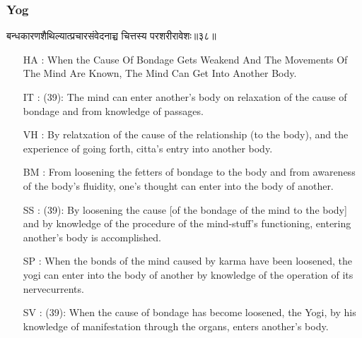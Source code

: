 \begin{frame}[fragile]\frametitle{Yog}
\begin{sanskrit}
बन्धकारणशैथिल्यात्प्रचारसंवेदनाच्च चित्तस्य परशरीरावेशः॥३८॥
\end{sanskrit}
	\begin{itemize}
	\item [HA]: When the Cause Of Bondage Gets Weakend And The Movements Of The Mind Are Known, The Mind Can Get Into Another Body.
	\item [IT]: (39): The mind can enter another’s body on relaxation of the cause of bondage and from knowledge of passages.
	\item [VH]: By relatxation of the cause of the relationship (to the body), and the experience of going forth, citta’s entry into another body.
	\item [BM]: From loosening the fetters of bondage to the body and from awareness of the body’s fluidity, one’s thought can enter into the body of another.
	\item [SS]: (39): By loosening the cause [of the bondage of the mind to the body] and by knowledge of the procedure of the mind-stuff’s functioning, entering another’s body is accomplished.
	\item [SP]: When the bonds of the mind caused by karma have been loosened, the yogi can enter into the body of another by knowledge of the operation of its nervecurrents.
	\item [SV]: (39): When the cause of bondage has become loosened, the Yogi, by his knowledge of manifestation through the organs, enters another’s body. 
	\end{itemize}
\end{frame}


